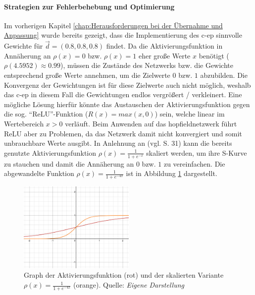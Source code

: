 \paragraph{Strategien zur Fehlerbehebung und Optimierung}
\label{chap:Strategien zur Fehlerbehebung und Optimierung}

Im vorherigen Kapitel \ref{chap:Herausforderungen bei der Übernahme und Anpassung} wurde bereits gezeigt, dass die Implementierung des \gls{c-ep} sinnvolle Gewichte für \(\vec{d}=(0.8,0.8,0.8)\) findet. Da die Aktivierungsfunktion in Annäherung an \(\rho(x)=0\) bzw. \(\rho(x)=1\) eher große Werte \(x\) benötigt (\(\rho(4.5952)\approx0.99\)), müssen die Zustände des Netzwerks bzw. die Gewichte entsprechend große Werte annehmen, um die Zielwerte \(0\) bzw. \(1\) abzubilden. Die Konvergenz der Gewichtungen ist für diese Zielwerte auch nicht möglich, weshalb das \gls{c-ep} in diesem Fall die Gewichtungen endlos vergrößert / verkleinert. Eine mögliche Lösung hierfür könnte das Austauschen der Aktivierungsfunktion gegen die sog. "`ReLU"'-Funktion (\(R(x)=max(x,0)\)) sein, welche linear im Wertebereich \(x>0\) verläuft. Beim Anwenden auf das \gls{hopfieldnetzwerk} führt ReLU aber zu Problemen, da das Netzwerk damit nicht konvergiert und somit unbrauchbare Werte ausgibt. In Anlehnung an \cite{Ernoult2020} (vgl. S. 31) kann die bereits genutzte Aktivierungsfunktion \(\rho(x)=\frac{1}{1+e^{-x}}\) skaliert werden, um ihre S-Kurve zu stauchen und damit die Annäherung an \(0\) bzw. \(1\) zu vereinfachen. Die abgewandelte Funktion \(\rho(x)=\frac{1}{1+e^{-4x}}\) ist in Abbildung \ref{fig:Graph der skalierten Aktivierungsfunktion} dargestellt.

\begin{figure}[h]
  \includegraphics[width=0.5\textwidth]{abbildungen/sigmoid_funktion_skaliert.png}
  \caption{Graph der Aktivierungsfunktion (rot) und der skalierten Variante \(\rho(x)=\frac{1}{1+e^{-4x}}\) (orange). Quelle: \textit{Eigene Darstellung}}
  \label{fig:Graph der skalierten Aktivierungsfunktion}
\end{figure}

